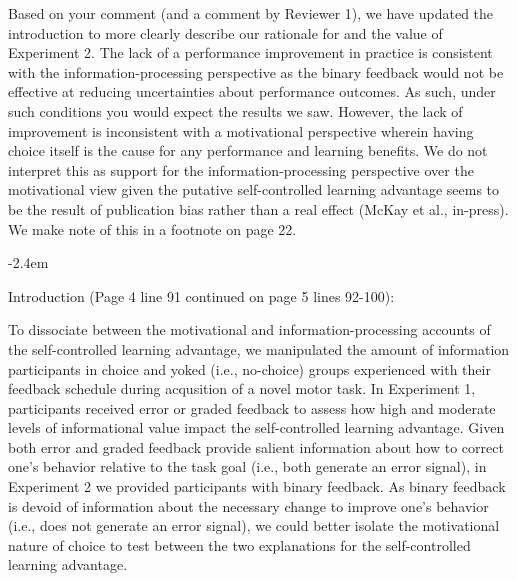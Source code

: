 \documentclass[final]{article}
\renewenvironment{quote}{\begin{fquote}\advance\leftmargini -2.4em\begin{oldquote}}{\end{oldquote}\end{fquote}}
\newenvironment{fquote}
  {\def\FrameCommand{
	\fboxsep=0.6em %
	\fcolorbox{black}{white}}%
    \MakeFramed {\advance\hsize-2\width \FrameRestore}
    \begin{minipage}{\linewidth}
  }
  {\end{minipage}\endMakeFramed}
\newcommand{\TaskEstimationBox}[2]{%
\ifoptiondraft{\parbox{1.0\linewidth}{\hfill \hfill {\colorbox{#2}{\color{White} \textbf{#1}}}}}%
{}%
}
\def\Done {\TaskEstimationBox{Done}{Blue}}
\begin{document}
\Done


Based on your comment (and a comment by Reviewer 1), we have updated the introduction to more clearly describe our rationale for and the value of Experiment 2. The lack of a performance improvement in practice is consistent with the information-processing perspective as the binary feedback would not be effective at reducing uncertainties about performance outcomes. As such, under such conditions you would expect the results we saw. However, the lack of improvement is inconsistent with a motivational perspective wherein having choice itself is the cause for any performance and learning benefits. We do not interpret this as support for the information-processing perspective over the motivational view given the putative self-controlled learning advantage seems to be the result of publication bias rather than a real effect (McKay et al., in-press). We make note of this in a footnote on page 22.

\begin{quote}
Introduction (Page 4 line 91 continued on page 5 lines 92-100):

To dissociate between the motivational and information-processing accounts of the self-controlled learning advantage, we manipulated the amount of information participants in choice and yoked (i.e., no-choice) groups experienced with their feedback schedule during acqusition of a novel motor task. In Experiment 1, participants received error or graded feedback to assess how high and moderate levels of informational value impact the self-controlled learning advantage. Given both error and graded feedback provide salient information about how to correct one's behavior relative to the task goal (i.e., both generate an error signal), in Experiment 2 we provided participants with binary feedback. As binary feedback is devoid of information about the necessary change to improve one's behavior (i.e., does not generate an error signal), we could better isolate the motivational nature of choice to test between the two explanations for the self-controlled learning advantage.
\end{quote}
\end{document}
